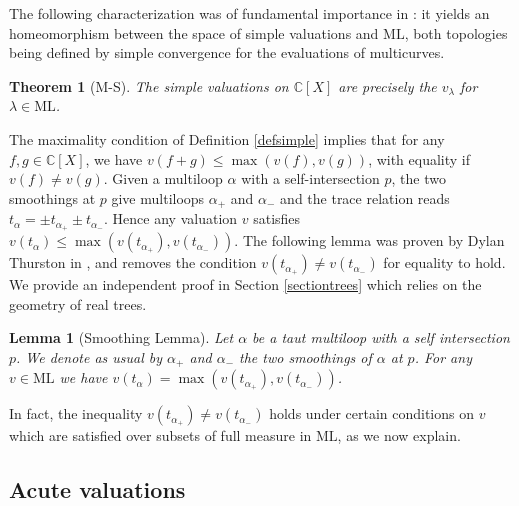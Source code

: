 \documentclass{amsart}
\newtheorem{lemma}{Lemma}
\newtheorem{theorem}{Theorem}
\newcommand{\C}{\mathbb{C}}
\newcommand{\ML}{\mathrm{ML}}
\begin{document}
The following characterization was of fundamental importance in \cite{MS_Aut(CV)_2020}: it yields an homeomorphism between the space of simple valuations and $\ML$, both topologies being defined by simple convergence for the evaluations of multicurves.

\begin{theorem}[M-S] The simple valuations on $\C[X]$ are precisely the $v_\lambda$ for $\lambda\in \ML$.
\end{theorem}

The maximality condition of Definition \ref{defsimple} implies that for any $f,g\in \C[X]$, we have $v(f+g)\le \max(v(f),v(g))$, with equality if $v(f)\ne v(g)$.
%
Given a multiloop $\alpha$ with a self-intersection $p$, the two smoothings at $p$ give multiloops $\alpha_+$ and $\alpha_-$ and the trace relation reads $t_{\alpha}=\pm t_{\alpha_+}\pm t_{\alpha_-}$.
Hence any valuation $v$ satisfies $v(t_{\alpha})\le \max(v(t_{\alpha_+}),v(t_{\alpha_-}))$.
%
The following lemma was proven by Dylan Thurston in \cite{Dylan_Thurston_intersection_2009}, and removes the condition $v(t_{\alpha_+})\ne v(t_{\alpha_-})$ for equality to hold. We provide an independent proof in Section \ref{sectiontrees} which relies on the geometry of real trees.

\begin{lemma}[Smoothing Lemma]\label{smoothinglemma}
Let $\alpha$ be a taut multiloop with a self intersection $p$. We denote as usual by $\alpha_+$ and $\alpha_-$ the two smoothings of $\alpha$ at $p$. 
For any $v\in \ML$ we have $v(t_{\alpha})=\max(v(t_{\alpha_+}),v(t_{\alpha_-}))$.
\end{lemma}


In fact, the inequality $v(t_{\alpha_+})\ne v(t_{\alpha_-})$ holds under certain conditions on $v$ which are satisfied over subsets of full measure in $\ML$, as we now explain. %


\subsection{Acute valuations}
\end{document}
